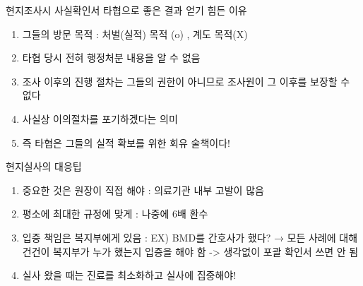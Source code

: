 현지조사시 사실확인서 타협으로 좋은 결과 얻기 힘든 이유 
\begin{enumerate}[1)]\tightlist
\item 그들의 방문 목적 : 처벌(실적) 목적 (o) , 계도 목적(X)
\item 타협 당시 전혀 행정처분 내용을 알 수 없음
\item 조사 이후의 진행 절차는 그들의 권한이 아니므로 조사원이 그 이후를 보장할 수 없다 
\item 사실상 이의절차를 포기하겠다는 의미 
\item 즉 타협은 그들의 실적 확보를 위한 회유 술책이다!  
\end{enumerate}

현지실사의 대응팁
\begin{enumerate}[1)]\tightlist
\item 중요한 것은 원장이 직접 해야 : 의료기관 내부 고발이 많음
\item 평소에 최대한 규정에 맞게 : 나중에 6배 환수
\item 입증 책임은 복지부에게 있음 :  EX) BMD를 간호사가 했다?  → 모든 사례에 대해 건건이 복지부가 누가 했는지 입증을 해야 함 -> 생각없이 포괄 확인서 쓰면 안 됨 
\item 실사 왔을 때는 진료를 최소화하고 실사에 집중해야!
\end{enumerate}
